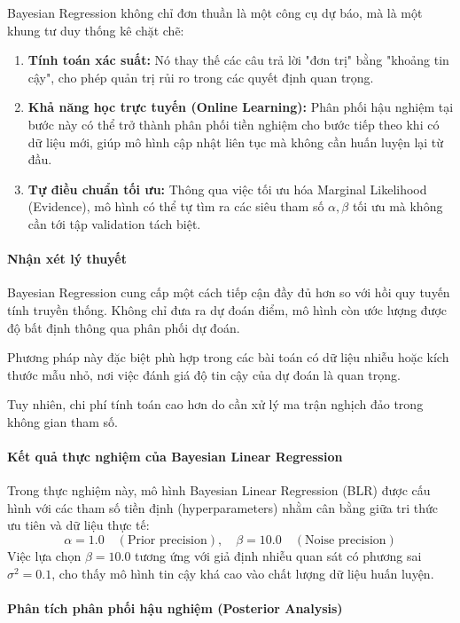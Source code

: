 Bayesian Regression không chỉ đơn thuần là một công cụ dự báo, mà là một khung tư duy thống kê chặt chẽ:
\begin{enumerate}
    \item \textbf{Tính toán xác suất:} Nó thay thế các câu trả lời "đơn trị" bằng "khoảng tin cậy", cho phép quản trị rủi ro trong các quyết định quan trọng.
    \item \textbf{Khả năng học trực tuyến (Online Learning):} Phân phối hậu nghiệm tại bước này có thể trở thành phân phối tiền nghiệm cho bước tiếp theo khi có dữ liệu mới, giúp mô hình cập nhật liên tục mà không cần huấn luyện lại từ đầu.
    \item \textbf{Tự điều chuẩn tối ưu:} Thông qua việc tối ưu hóa Marginal Likelihood (Evidence), mô hình có thể tự tìm ra các siêu tham số $\alpha, \beta$ tối ưu mà không cần tới tập validation tách biệt.
\end{enumerate}

\paragraph{Nhận xét lý thuyết}

Bayesian Regression cung cấp một cách tiếp cận đầy đủ hơn so với hồi quy tuyến tính truyền thống.
Không chỉ đưa ra dự đoán điểm, mô hình còn ước lượng được độ bất định thông qua phân phối dự đoán.

Phương pháp này đặc biệt phù hợp trong các bài toán có dữ liệu nhiễu hoặc kích thước mẫu nhỏ,
nơi việc đánh giá độ tin cậy của dự đoán là quan trọng.

Tuy nhiên, chi phí tính toán cao hơn do cần xử lý ma trận nghịch đảo trong không gian tham số.

\paragraph{Kết quả thực nghiệm của Bayesian Linear Regression}

Trong thực nghiệm này, mô hình Bayesian Linear Regression (BLR) được cấu hình với các tham số tiền định (hyperparameters) nhằm cân bằng giữa tri thức ưu tiên và dữ liệu thực tế:
\[
\alpha = 1.0 \quad (\text{Prior precision}), \quad \beta = 10.0 \quad (\text{Noise precision})
\]
Việc lựa chọn $\beta = 10.0$ tương ứng với giả định nhiễu quan sát có phương sai $\sigma^2 = 0.1$, cho thấy mô hình tin cậy khá cao vào chất lượng dữ liệu huấn luyện.

\paragraph{Phân tích phân phối hậu nghiệm (Posterior Analysis)}

